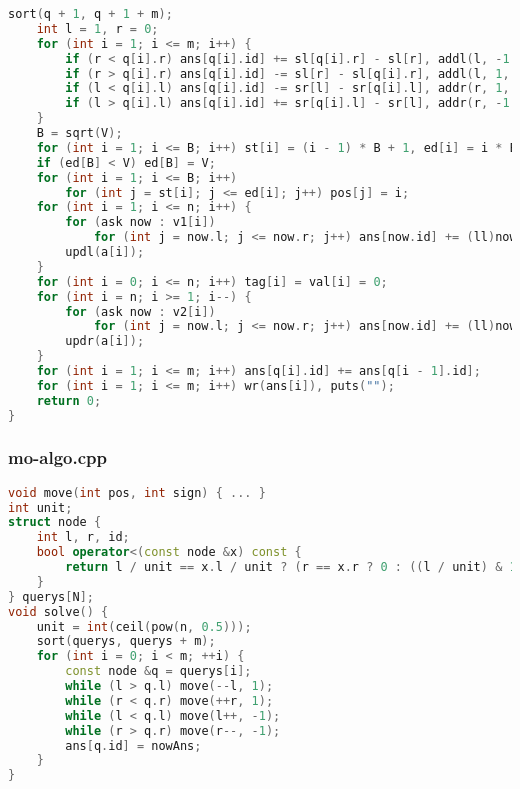 \documentclass[9pt, a4paper, oneside]{book}
\begin{document}
\begin{lstlisting}[language={C++}]
    sort(q + 1, q + 1 + m);
    int l = 1, r = 0;
    for (int i = 1; i <= m; i++) {
        if (r < q[i].r) ans[q[i].id] += sl[q[i].r] - sl[r], addl(l, -1, r + 1, q[i].r, q[i].id), r = q[i].r;
        if (r > q[i].r) ans[q[i].id] -= sl[r] - sl[q[i].r], addl(l, 1, q[i].r + 1, r, q[i].id), r = q[i].r;
        if (l < q[i].l) ans[q[i].id] -= sr[l] - sr[q[i].l], addr(r, 1, l, q[i].l - 1, q[i].id), l = q[i].l;
        if (l > q[i].l) ans[q[i].id] += sr[q[i].l] - sr[l], addr(r, -1, q[i].l, l - 1, q[i].id), l = q[i].l;
    }
    B = sqrt(V);
    for (int i = 1; i <= B; i++) st[i] = (i - 1) * B + 1, ed[i] = i * B;
    if (ed[B] < V) ed[B] = V;
    for (int i = 1; i <= B; i++)
        for (int j = st[i]; j <= ed[i]; j++) pos[j] = i;
    for (int i = 1; i <= n; i++) {
        for (ask now : v1[i])
            for (int j = now.l; j <= now.r; j++) ans[now.id] += (ll)now.op * (tag[pos[a[j] + 1]] + val[a[j] + 1]);
        updl(a[i]);
    }
    for (int i = 0; i <= n; i++) tag[i] = val[i] = 0;
    for (int i = n; i >= 1; i--) {
        for (ask now : v2[i])
            for (int j = now.l; j <= now.r; j++) ans[now.id] += (ll)now.op * (tag[pos[a[j] - 1]] + val[a[j] - 1]);
        updr(a[i]);
    }
    for (int i = 1; i <= m; i++) ans[q[i].id] += ans[q[i - 1].id];
    for (int i = 1; i <= m; i++) wr(ans[i]), puts("");
    return 0;
}\end{lstlisting}
\subsubsection{mo-algo.cpp}
\begin{lstlisting}[language={C++}]
void move(int pos, int sign) { ... }
int unit;
struct node {
    int l, r, id;
    bool operator<(const node &x) const {
        return l / unit == x.l / unit ? (r == x.r ? 0 : ((l / unit) & 1) ^ (r < x.r)) : l < x.l;
    }
} querys[N];
void solve() {
    unit = int(ceil(pow(n, 0.5)));
    sort(querys, querys + m);
    for (int i = 0; i < m; ++i) {
        const node &q = querys[i];
        while (l > q.l) move(--l, 1);
        while (r < q.r) move(++r, 1);
        while (l < q.l) move(l++, -1);
        while (r > q.r) move(r--, -1);
        ans[q.id] = nowAns;
    }
}\end{lstlisting}
\end{document}
